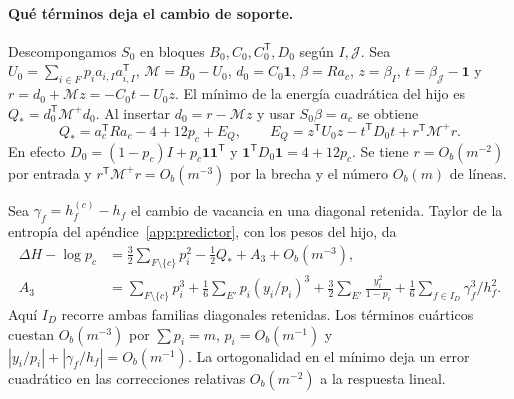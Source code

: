 \paragraph{Qué términos deja el cambio de soporte.}
Descompongamos \(S_0\) en bloques \(B_0,C_0,C_0^{\mathsf T},D_0\) según \(I,\mathcal J\).
Sea \(U_0=\sum_{i\in F}p_i a_{i,I}a_{i,I}^{\mathsf T}\),
\(\mathcal M=B_0-U_0\), \(d_0=C_0\mathbf1\), \(\beta=Ra_c\),
\(z=\beta_I\), \(t=\beta_{\mathcal J}-\mathbf1\) y \(r=d_0+\mathcal M z=-C_0t-U_0z\).
El mínimo de la energía cuadrática del hijo es \(Q_*=d_0^{\mathsf T}\mathcal M^+d_0\).
Al insertar \(d_0=r-\mathcal Mz\) y usar \(S_0\beta=a_c\) se obtiene
\[
 Q_*=a_c^{\mathsf T}Ra_c-4+12p_c+E_Q,\qquad
 E_Q=z^{\mathsf T}U_0z-t^{\mathsf T}D_0t+r^{\mathsf T}\mathcal M^+r .
\]
En efecto \(D_0=(1-p_c)I+p_c\mathbf1\mathbf1^{\mathsf T}\) y
\(\mathbf1^{\mathsf T}D_0\mathbf1=4+12p_c\). Se tiene \(r=O_b(m^{-2})\) por entrada
y \(r^{\mathsf T}\mathcal M^+r=O_b(m^{-3})\) por la brecha y el número \(O_b(m)\) de líneas.

Sea \(\gamma_f=h_f^{(c)}-h_f\) el cambio de vacancia en una diagonal retenida.
Taylor de la entropía del apéndice~\ref{app:predictor}, con los pesos del hijo, da
\begin{align*}
 \Delta H-\log p_c&=\tfrac32\sum_{F\setminus\{c\}}p_i^2-\tfrac12 Q_*+A_3+O_b(m^{-3}),\\
 A_3&=\sum_{F\setminus\{c\}}p_i^3+\tfrac16\sum_{E'}p_i(y_i/p_i)^3
 +\tfrac32\sum_{E'}\frac{y_i^2}{1-p_i}+\tfrac16\sum_{f\in I_D}\gamma_f^3/h_f^2 .
\end{align*}
Aquí \(I_D\) recorre ambas familias diagonales retenidas. Los términos cuárticos cuestan
\(O_b(m^{-3})\) por \(\sum p_i=m\), \(p_i=O_b(m^{-1})\) y
\(|y_i/p_i|+|\gamma_f/h_f|=O_b(m^{-1})\). La ortogonalidad en el mínimo deja un error
cuadrático en las correcciones relativas \(O_b(m^{-2})\) a la respuesta lineal.

